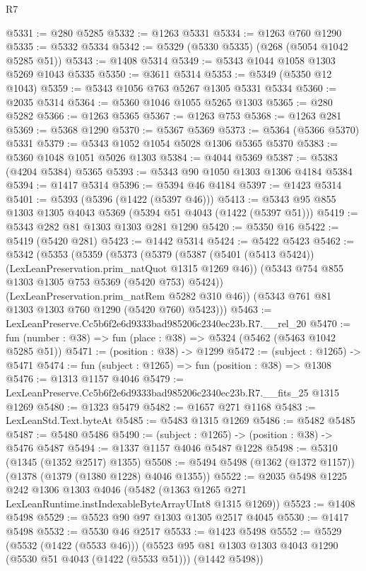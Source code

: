 \begin{lexlean}{R7}
\begin{coremodule}
@5331 := @280 @5285
@5332 := @1263 @5331
@5334 := @1263 @760 @1290
@5335 := @5332 @5334
@5342 := @5329 (@5330 @5335) (@268 (@5054 @1042 @5285 @51))
@5343 := @1408 @5314
@5349 := @5343 @1044 @1058 @1303 @5269 @1043 @5335
@5350 := @3611 @5314
@5353 := @5349 (@5350 @12 @1043)
@5359 := @5343 @1056 @763 @5267 @1305 @5331 @5334
@5360 := @2035 @5314
@5364 := @5360 @1046 @1055 @5265 @1303
@5365 := @280 @5282
@5366 := @1263 @5365
@5367 := @1263 @753
@5368 := @1263 @281
@5369 := @5368 @1290
@5370 := @5367 @5369
@5373 := @5364 (@5366 @5370) @5331
@5379 := @5343 @1052 @1054 @5028 @1306 @5365 @5370
@5383 := @5360 @1048 @1051 @5026 @1303
@5384 := @4044 @5369
@5387 := @5383 (@4204 @5384) @5365
@5393 := @5343 @90 @1050 @1303 @1306 @4184 @5384
@5394 := @1417 @5314
@5396 := @5394 @46 @4184
@5397 := @1423 @5314
@5401 := @5393 (@5396 (@1422 (@5397 @46)))
@5413 := @5343 @95 @855 @1303 @1305 @4043 @5369 (@5394 @51 @4043 (@1422 (@5397 @51)))
@5419 := @5343 @282 @81 @1303 @1303 @281 @1290
@5420 := @5350 @16
@5422 := @5419 (@5420 @281)
@5423 := @1442 @5314
@5424 := @5422 @5423
@5462 := @5342
    (@5353
      (@5359
        (@5373
          (@5379
            (@5387 (@5401 (@5413 @5424)) (LexLeanPreservation.prim_natQuot @1315 @1269 @46))
            (@5343 @754 @855 @1303 @1305 @753 @5369 (@5420 @753) @5424))
          (LexLeanPreservation.prim_natRem @5282 @310 @46))
        (@5343 @761 @81 @1303 @1303 @760 @1290 (@5420 @760) @5423)))
@5463 := LexLeanPreserve.Cc5b6f2e6d9333bad985206c2340ec23b.R7.__rel_20
@5470 := fun (number : @38) => fun (place : @38) => @5324 (@5462 (@5463 @1042 @5285 @51))
@5471 := (position : @38) -> @1299
@5472 := (subject : @1265) -> @5471
@5474 := fun (subject : @1265) => fun (position : @38) => @1308
@5476 := @1313 @1157 @4046
@5479 := LexLeanPreserve.Cc5b6f2e6d9333bad985206c2340ec23b.R7.__fits_25 @1315 @1269
@5480 := @1323 @5479
@5482 := @1657 @271 @1168
@5483 := LexLeanStd.Text.byteAt
@5485 := @5483 @1315 @1269
@5486 := @5482 @5485
@5487 := @5480 @5486
@5490 := (subject : @1265) -> (position : @38) -> @5476 @5487
@5494 := @1337 @1157 @4046 @5487 @1228
@5498 := @5310 (@1345 (@1352 @2517) @1355)
@5508 := @5494 @5498 (@1362 (@1372 @1157)) (@1378 (@1379 (@1380 @1228) @4046 @1355))
@5522 := @2035
    @5498
    @1225
    @242
    @1306
    @1303
    @4046
    (@5482 (@1363 @1265 @271 LexLeanRuntime.instIndexableByteArrayUInt8 @1315 @1269))
@5523 := @1408 @5498
@5529 := @5523 @90 @97 @1303 @1305 @2517 @4045
@5530 := @1417 @5498
@5532 := @5530 @46 @2517
@5533 := @1423 @5498
@5552 := @5529
    (@5532 (@1422 (@5533 @46)))
    (@5523 @95 @81 @1303 @1303 @4043 @1290 (@5530 @51 @4043 (@1422 (@5533 @51))) (@1442 @5498))

\end{coremodule}
\end{lexlean}
